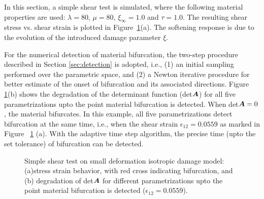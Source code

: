 \documentclass[12pt]{article}
\numberwithin{equation}{section}
\begin{document}
In this section, a simple shear test is simulated, where the following 
material properties are used: $\lambda = 80$, $\mu = 80$, 
$\xi_{\infty} = 1.0$ and $\tau = 1.0$. The resulting shear stress vs. 
shear strain is plotted in Figure~\ref{fig:iso_stress_strain}(a). The 
softening response is due to the evolution of the introduced damage 
parameter $\xi$. 

For the numerical detection of material bifurcation, the two-step 
procedure described in Section \ref{sec:detection} is adopted, i.e., 
(1) an initial sampling performed over the parametric space, and (2) a 
Newton iterative procedure for better estimate of the onset of  
bifurcation and its associated directions. Figure~
\ref{fig:iso_stress_strain}(b) shows the degradation of the 
determinant function (det${\boldsymbol{A}}$) for all five parametrizations upto the 
point material bifurcation is detected. When det${\boldsymbol{A}} = 0$, the 
material bifurcates. In this example, all five parametrizations detect 
bifurcation at the same time, i.e., when the shear strain 
$\epsilon_{12}=0.0559$ as marked in Figure~
\ref{fig:iso_stress_strain} (a). With the adaptive time step 
algorithm, the precise time (upto the set tolerance) of bifurcation 
can be detected.

\begin{figure}[H]
  \centering {} 
  \caption{Simple shear test on small deformation 
  isotropic damage model: 
  (a)stress strain behavior, with red cross indicating bifurcation, and
  (b) degradation of det${\boldsymbol{A}}$ for different
  parametrizations upto the point material bifurcation is detected ($\epsilon_{12}=0.0559$).}
  \label{fig:iso_stress_strain}
\end{figure}
\end{document}
